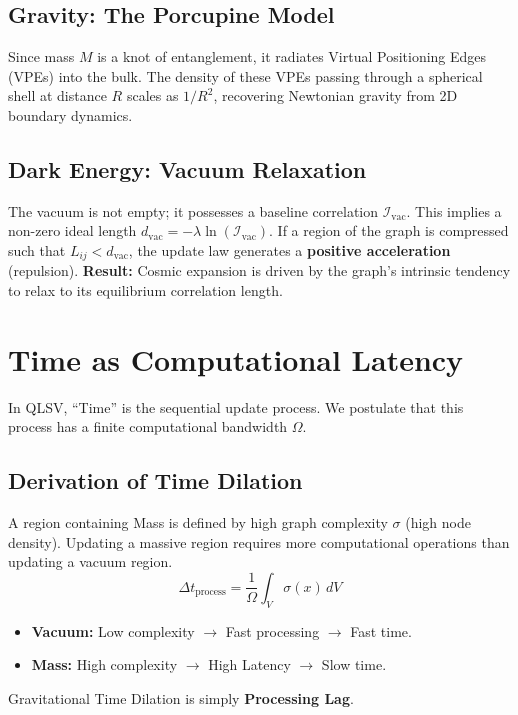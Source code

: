 \documentclass[11pt, a4paper]{article}
\begin{document}
\subsection{Gravity: The Porcupine Model}
Since mass $M$ is a knot of entanglement, it radiates Virtual Positioning Edges (VPEs) into the bulk. The density of these VPEs passing through a spherical shell at distance $R$ scales as $1/R^2$, recovering Newtonian gravity from 2D boundary dynamics.

\subsection{Dark Energy: Vacuum Relaxation}
The vacuum is not empty; it possesses a baseline correlation $\mathcal{I}_{\text{vac}}$. This implies a non-zero ideal length $d_{\text{vac}} = -\lambda \ln(\mathcal{I}_{\text{vac}})$.
If a region of the graph is compressed such that $L_{ij} < d_{\text{vac}}$, the update law generates a \textbf{positive acceleration} (repulsion). 
\textbf{Result:} Cosmic expansion is driven by the graph's intrinsic tendency to relax to its equilibrium correlation length.

\section{Time as Computational Latency}

In QLSV, ``Time'' is the sequential update process. We postulate that this process has a finite computational bandwidth $\Omega$.

\subsection{Derivation of Time Dilation}
A region containing Mass is defined by high graph complexity $\sigma$ (high node density). Updating a massive region requires more computational operations than updating a vacuum region.
\begin{equation}
    \Delta t_{\text{process}} = \frac{1}{\Omega} \int_V \sigma(x) \, dV
\end{equation}
\begin{itemize}
    \item \textbf{Vacuum:} Low complexity $\to$ Fast processing $\to$ Fast time.
    \item \textbf{Mass:} High complexity $\to$ High Latency $\to$ Slow time.
\end{itemize}
Gravitational Time Dilation is simply \textbf{Processing Lag}.
\end{document}
